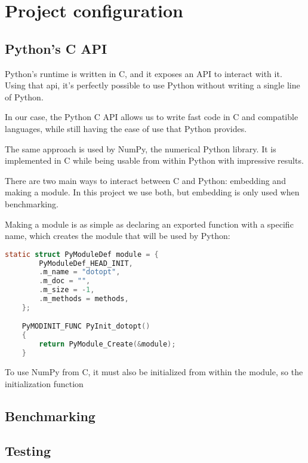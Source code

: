 \chapter{Project configuration}


\section{Python's C API}

    Python's runtime is written in C, and it exposes an API to interact with it.
Using that api, it's perfectly possible to use Python without writing a single
line of Python.

    In our case, the Python C API allows us to write fast code in C and
compatible languages, while still having the ease of use that Python provides.

    The same approach is used by NumPy, the numerical Python library. It is
implemented in C while being usable from within Python with impressive results.

    There are two main ways to interact between C and Python: embedding and
making a module. In this project we use both, but embedding is only used when
benchmarking.

    Making a module is as simple as declaring an exported function with a
specific name, which creates the module that will be used by Python:

\begin{lstlisting}[language=C]
    static struct PyModuleDef module = {
        PyModuleDef_HEAD_INIT,
        .m_name = "dotopt",
        .m_doc = "",
        .m_size = -1,
        .m_methods = methods,
    };

    PyMODINIT_FUNC PyInit_dotopt()
    {
        return PyModule_Create(&module);
    }
\end{lstlisting}

    To use NumPy from C, it must also be initialized from within the module, so
the initialization function 


\section{Benchmarking}


\section{Testing}
